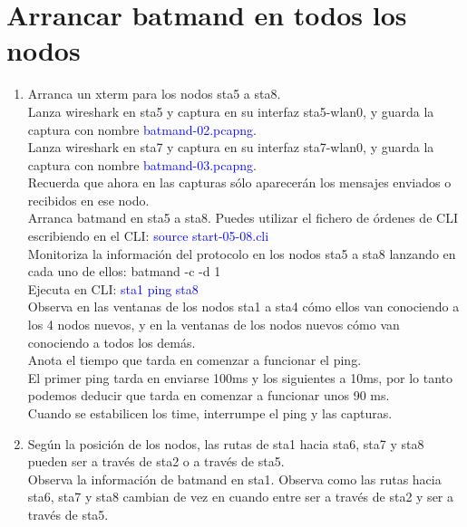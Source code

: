 \documentclass[12pt, a4paper]{report}
\begin{document}
\chapter{Arrancar batmand en todos los nodos}
\begin{enumerate}
	\item Arranca un xterm para los nodos sta5 a sta8.\\
	
	Lanza wireshark en sta5 y captura en su interfaz sta5-wlan0, y guarda la captura con nombre
	\textcolor{blue}{batmand-02.pcapng}.\\
	
	Lanza wireshark en sta7 y captura en su interfaz sta7-wlan0, y guarda la captura con nombre
	\textcolor{blue}{batmand-03.pcapng}.\\
	
	Recuerda que ahora en las capturas sólo aparecerán los mensajes enviados o recibidos en ese
	nodo.\\
	
	Arranca batmand en sta5 a sta8. Puedes utilizar el fichero de órdenes de CLI escribiendo en el
	CLI: \textcolor{blue}{source start-05-08.cli}\\
	
	Monitoriza la información del protocolo en los nodos sta5 a sta8 lanzando en cada uno de ellos:
	batmand -c -d 1\\
	
	Ejecuta en CLI: \textcolor{blue}{sta1 ping sta8}\\
	
	Observa en las ventanas de los nodos sta1 a sta4 cómo ellos van conociendo a los 4 nodos nuevos,
	y en la ventanas de los nodos nuevos cómo van conociendo a todos los demás.\\
	
	Anota el tiempo que tarda en comenzar a funcionar el ping.\\
	
	El primer ping tarda en enviarse 100ms y los siguientes a 10ms, por lo tanto podemos deducir que tarda en comenzar a funcionar unos 90 ms.\\
	
	
	Cuando se estabilicen los time, interrumpe el ping y las capturas.
	\item Según la posición de los nodos, las rutas de sta1 hacia sta6, sta7 y sta8 pueden ser a través de
	sta2 o a través de sta5.\\
	
	Observa la información de batmand en sta1. Observa como las rutas hacia sta6, sta7 y sta8
	cambian de vez en cuando entre ser a través de sta2 y ser a través de sta5.\\
	

\end{enumerate}
\end{document}
